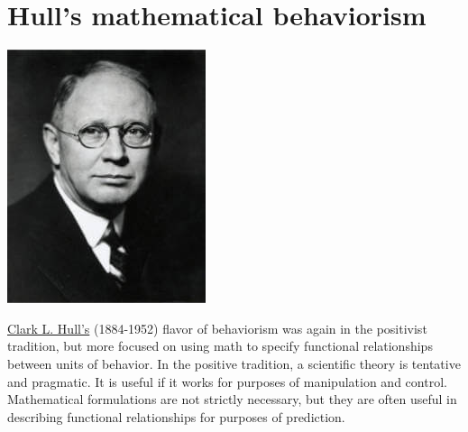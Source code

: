 \documentclass[
  oneside,
  12pt]{crumpbook}
\newenvironment{floatright25}{%
  \wrapfigure{R}{.25\textwidth}%
  }{%
  \endwrapfigure}
\begin{document}
\hypertarget{hulls-mathematical-behaviorism}{%
\section{Hull's mathematical behaviorism}\label{hulls-mathematical-behaviorism}}

\begin{floatright25}
\includegraphics[width=1\linewidth]{imgs/clark-l-hull}

\end{floatright25}

\href{https://en.wikipedia.org/wiki/Clark_L._Hull}{Clark L. Hull's} (1884-1952) flavor of behaviorism was again in the positivist tradition, but more focused on using math to specify functional relationships between units of behavior. In the positive tradition, a scientific theory is tentative and pragmatic. It is useful if it works for purposes of manipulation and control. Mathematical formulations are not strictly necessary, but they are often useful in describing functional relationships for purposes of prediction.
\end{document}
